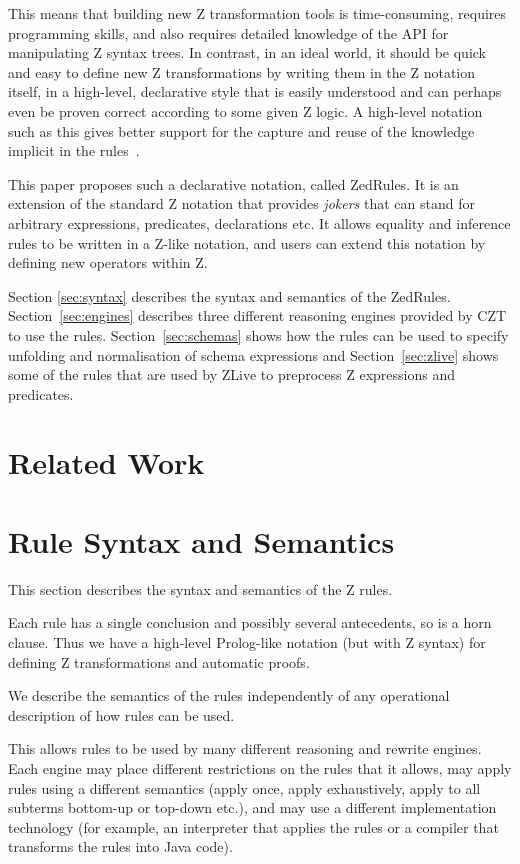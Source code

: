 \documentclass{entcs}
\begin{document}
This means that building new Z transformation tools is time-consuming,
requires programming skills, and also requires detailed knowledge of the
API for manipulating Z syntax trees.  In contrast, in an ideal world, it
should be quick and easy to define new Z transformations by writing them in
the Z notation itself, in a high-level, declarative style that is easily
understood and can perhaps even be proven correct according to some given Z
logic.  A high-level notation such as this gives better support for the
capture and reuse of the knowledge implicit in the rules~\cite{DenningACM}.

This paper proposes such a declarative notation, called ZedRules.
It is an extension of the standard Z notation that provides \emph{jokers}
that can stand for arbitrary expressions, predicates, declarations etc.
It allows equality and inference rules to be written in a Z-like notation,
and users can extend this notation by defining new operators within Z.

Section \ref{sec:syntax} describes the syntax and semantics of the
ZedRules.  Section~\ref{sec:engines} describes three different reasoning
engines provided by CZT to use the rules.  Section~\ref{sec:schemas} shows
how the rules can be used to specify unfolding and normalisation of schema
expressions and Section~\ref{sec:zlive} shows some of the rules that are
used by ZLive to preprocess Z expressions and predicates.



\section{Related Work}


\section{Rule Syntax and Semantics}

This section describes the syntax and semantics of the Z rules.

Each rule has a single conclusion and possibly several antecedents, so is a
horn clause.  Thus we have a high-level Prolog-like notation (but with Z
syntax) for defining Z transformations and automatic proofs.

We describe the semantics of the rules independently of any operational
description of how rules can be used. 

This allows rules to be used by many different reasoning and rewrite
engines.  Each engine may place different restrictions on the rules
that it allows, may apply rules using a different semantics (apply once,
apply exhaustively, apply to all subterms bottom-up or top-down etc.), and
may use a different implementation technology (for example, an interpreter
that applies the rules or a compiler that transforms the rules into Java
code).
\end{document}
